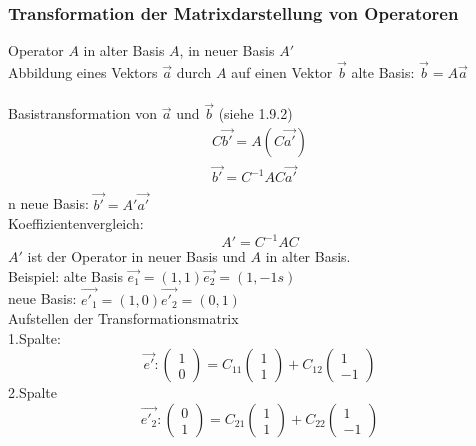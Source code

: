 \documentclass{article}
\begin{document}
\subsubsection{Transformation der Matrixdarstellung von Operatoren}
Operator $A$ in alter Basis $A$, in neuer Basis $A'$\\
Abbildung eines Vektors $\vec{a}$ durch $A$ auf einen Vektor $\vec{b}$
alte Basis: $\vec{b}=A\vec{a}$\\\\
Basistransformation von $\vec{a}$ und $\vec{b}$ (siehe 1.9.2)\\
\begin{eqnarray*}
    C\vec{b'}=A(C\vec{a'})\\
    \vec{b'}=C^{-1}AC\vec{a'}\\
\end{eqnarray*}n
neue Basis: $\vec{b'} = A'\vec{a'}$\\
Koeffizientenvergleich:
\begin{equation*}
    A' = C^{-1}AC
\end{equation*}
$A'$ ist der Operator in neuer Basis und $A$ in alter Basis.\\
Beispiel: alte Basis $\vec{e_1}=(1,1) \vec{e_2}=(1,-1s)$\\
\hspace*{2cm} neue Basis: $\vec{e'_1}=(1,0) \vec{e'_2}=(0,1)$\\
Aufstellen der Transformationsmatrix\\
1.Spalte:
\begin{equation*}
    \vec{e'}: \left(\begin{array}{c}1\\0\end{array}\right)=C_{11}\left(\begin{array}{c}1\\1\end{array}\right)+C_{12}\left(\begin{array}{c}1\\-1\end{array}\right)
\end{equation*}
2.Spalte
\begin{equation*}
    \vec{e'_2}: \left(\begin{array}{c}0\\1\end{array}\right)=C_{21}\left(\begin{array}{c}1\\1\end{array}\right)+C_{22}\left(\begin{array}{c}1\\-1\end{array}\right)
\end{equation*}
\end{document}
